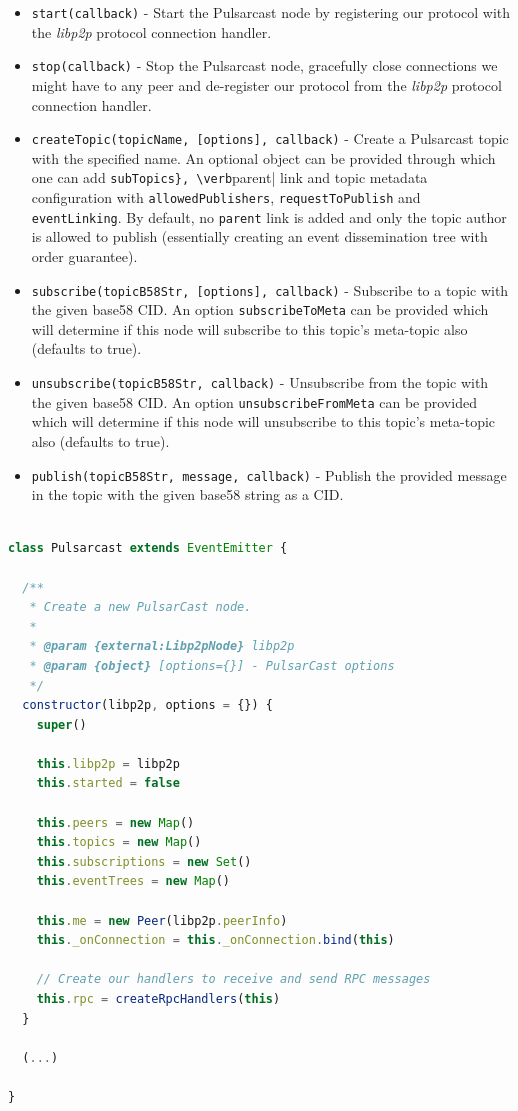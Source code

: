 \begin{itemize}
  \item
    \verb|start(callback)| -  Start the Pulsarcast node by registering our protocol with the \emph{libp2p} protocol connection handler.
  \item
    \verb|stop(callback)| - Stop the Pulsarcast node, gracefully close connections we might have to any peer and de-register our protocol from the \emph{libp2p} protocol connection handler.
  \item
  \verb|createTopic(topicName, [options], callback)| - Create a Pulsarcast topic with the specified name. An optional object can be provided through which one can add \verb|subTopics}, \verb|parent| link and topic metadata configuration with \verb|allowedPublishers|, \verb|requestToPublish| and \verb|eventLinking|. By default, no \verb|parent| link is added and only the topic author is allowed to publish (essentially creating an event dissemination tree with order guarantee).
  \item
    \verb|subscribe(topicB58Str, [options], callback)| - Subscribe to a topic with the given base58 CID. An option \verb|subscribeToMeta| can be provided which will determine if this node will subscribe to this topic's meta-topic also (defaults to true).
  \item
    \verb|unsubscribe(topicB58Str, callback)| - Unsubscribe from the topic with the given base58 CID. An option \verb|unsubscribeFromMeta| can be provided which will determine if this node will unsubscribe to this topic's meta-topic also (defaults to true).
  \item
    \verb|publish(topicB58Str, message, callback)| - Publish the provided message in the topic with the given base58 string as a CID.
\end{itemize}

\begin{lstlisting}[language=JavaScript, float, caption={Pulsarcast constructor},label={pulsarcast-constructor}]

class Pulsarcast extends EventEmitter {

  /**
   * Create a new PulsarCast node.
   *
   * @param {external:Libp2pNode} libp2p
   * @param {object} [options={}] - PulsarCast options
   */
  constructor(libp2p, options = {}) {
    super()

    this.libp2p = libp2p
    this.started = false

    this.peers = new Map()
    this.topics = new Map()
    this.subscriptions = new Set()
    this.eventTrees = new Map()

    this.me = new Peer(libp2p.peerInfo)
    this._onConnection = this._onConnection.bind(this)

    // Create our handlers to receive and send RPC messages
    this.rpc = createRpcHandlers(this)
  }

  (...)

}
\end{lstlisting}

